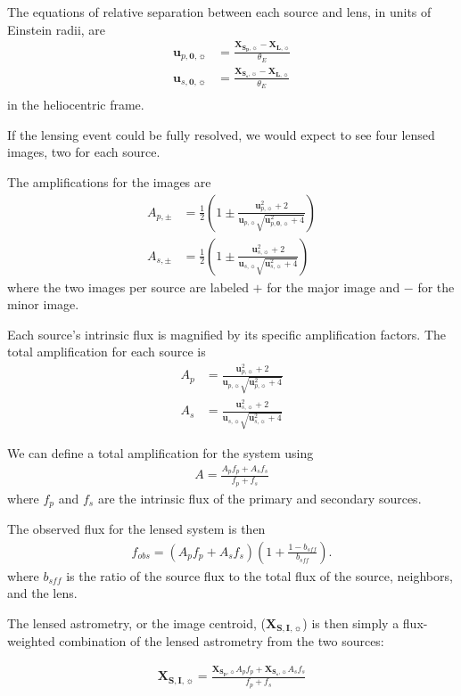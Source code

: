 \documentclass[twocolumn]{aastex701}
\newcommand{\vect}[1]{\boldsymbol{#1}}
\newcommand{\thetaE}{\theta_E}
\newcommand{\Xlvec}{\vect{X}_{\boldsymbol{L},\sun}}
\newcommand{\bsff}{b_{sff}}
\newcommand{\Xspvec}{\vect{X}_{\boldsymbol{S_p},\sun}}
\newcommand{\XIvec}{\vect{X}_{\boldsymbol{S, I},\sun}}
\newcommand{\Xssvec}{\vect{X}_{\boldsymbol{S_s},\sun}}
\newcommand{\upvec}{\vect{u}_{p,\sun}}
\newcommand{\usvec}{\vect{u}_{s,\sun}}
\newcommand{\upveco}{\vect{u}_{p,\boldsymbol{0},\sun}}
\newcommand{\usveco}{\vect{u}_{s,\boldsymbol{0},\sun}}
\begin{document}
The equations of relative separation between each source and lens, in units of Einstein radii, are
\begin{eqnarray}
\upveco &= \frac{\Xspvec-\Xlvec}{\thetaE} \\
\usveco &= \frac{\Xssvec-\Xlvec}{\thetaE} \\
\end{eqnarray}
in the heliocentric frame.

If the lensing event could be fully resolved, we would expect to see four lensed images, two for each source. 

The amplifications for the images are
\begin{eqnarray}
A_{p,\pm} &= \frac{1}{2} \left( 1 \pm \frac{\upvec^2 + 2}{\upvec \sqrt{\upveco^2 + 4}} \right) \\
A_{s,\pm} &= \frac{1}{2} \left( 1 \pm \frac{\usvec^2 + 2}{\usvec \sqrt{\usvec^2 + 4}} \right) 
\end{eqnarray}
where the two images per source are labeled $+$ for the major image and $-$ for the minor image.


Each source's intrinsic flux is magnified by its specific amplification factors. The total amplification for each source is
\begin{eqnarray}
 A_p &= \frac{\upvec^2 + 2}{\upvec \sqrt{\upvec^2 + 4}} \\
 A_s &= \frac{\usvec^2 + 2}{\usvec \sqrt{\usvec^2 + 4}}
\end{eqnarray}

We can define a total amplification for the system using
\begin{eqnarray}
 A = \frac{A_p f_p + A_s f_s}{f_p + f_s}
\end{eqnarray}
where $f_p$ and $f_s$ are the intrinsic flux of the primary and secondary sources.

The observed flux for the lensed system is then
\begin{eqnarray}
f_{obs} = (A_p f_p + A_s f_s) \left(1 + \frac{1 - \bsff}{\bsff} \right).
\end{eqnarray}
where $\bsff$ is the ratio of the source flux to the total flux of the source, neighbors, and the lens.  

The lensed astrometry, or the image centroid, ($\XIvec$) is then simply a flux-weighted combination of the lensed astrometry from the two sources:

\begin{eqnarray}
    \XIvec = \frac{\Xspvec A_p f_p + \Xssvec A_s f_s}{f_p+f_s}
\end{eqnarray}
\end{document}
